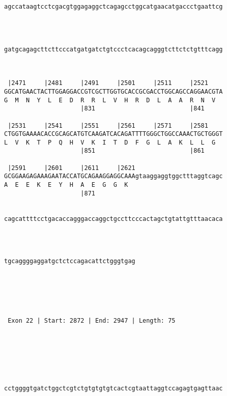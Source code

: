 \documentclass{article}
\begin{document}
\begin{Verbatim}
   
                                                            
agccataagtcctcgacgtggagaggctcagagcctggcatgaacatgaccctgaattcg
                                                            
                                                            
   
                                                            
gatgcagagcttcttcccatgatgatctgtccctcacagcagggtcttctctgtttcagg
                                                            
                                                            
   
 |2471     |2481     |2491     |2501     |2511     |2521    
GGCATGAACTACTTGGAGGACCGTCGCTTGGTGCACCGCGACCTGGCAGCCAGGAACGTA
G  M  N  Y  L  E  D  R  R  L  V  H  R  D  L  A  A  R  N  V  
                     |831                          |841     
   
 |2531     |2541     |2551     |2561     |2571     |2581    
CTGGTGAAAACACCGCAGCATGTCAAGATCACAGATTTTGGGCTGGCCAAACTGCTGGGT
L  V  K  T  P  Q  H  V  K  I  T  D  F  G  L  A  K  L  L  G  
                     |851                          |861     
   
 |2591     |2601     |2611     |2621                        
GCGGAAGAGAAAGAATACCATGCAGAAGGAGGCAAAgtaaggaggtggctttaggtcagc
A  E  E  K  E  Y  H  A  E  G  G  K                          
                     |871                                   
   
                                                            
cagcattttcctgacaccagggaccaggctgccttcccactagctgtattgtttaacaca
                                                            
                                                            
   
                                    
tgcaggggaggatgctctccagacattctgggtgag
                                    
                                    
  



 Exon 22 | Start: 2872 | End: 2947 | Length: 75 





   
                                                            
cctggggtgatctggctcgtctgtgtgtgtcactcgtaattaggtccagagtgagttaac
                                                            

\end{Verbatim}
\end{document}
